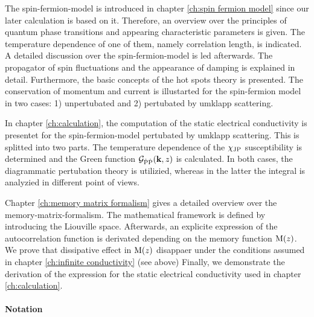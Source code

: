 The spin-fermion-model is introduced in chapter \ref{ch:spin fermion model} since our later calculation is based on it.
Therefore, an overview over the principles of quantum phase transitions and appearing characteristic parameters is given.
The temperature dependence of one of them, namely correlation length, is indicated.
A detailed discussion over the spin-fermion-model is led afterwards.
The propagator of spin fluctuations and the appearance of damping is explained in detail.
Furthermore, the basic concepts of the hot spots theory is presented.
The conservation of momentum and current is illustarted for the spin-fermion model in two cases:
1) unpertubated and 
2) pertubated by umklapp scattering.

In chapter \ref{ch:calculation}, the computation of the static electrical conductivity is presentet for the spin-fermion-model pertubated by umklapp scattering.
This is splitted into two parts.
The temperature dependence of the $\chi_{\mathrm{JP}}$ susceptibility is determined and the Green function $\mathcal{G}_{\dot{\mathrm{P}}\dot{\mathrm{P}}}(\vb{k},z)$ is calculated.
In both cases, the diagrammatic pertubation theory is utilizied, whereas in the latter the integral is analyzied in different point of views.

Chapter \ref{ch:memory matrix formalism} gives a detailed overview over the memory-matrix-formalism.
The mathematical framework is defined by introducing the Liouville space.
Afterwards, an explicite expression of the autocorrelation function is derivated depending on the memory function $\mathrm{M}(z)$.
We prove that dissipative effect in $\mathrm{M}(z)$ disappaer under the conditions assumed in chapter \ref{ch:infinite conductivity} (see above) 
Finally, we demonstrate the derivation of the expression for the static electrical conductivity used in chapter \ref{ch:calculation}.

\paragraph{Notation}$\:$\vspace{3.5ex}


